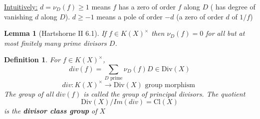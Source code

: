 \documentclass[11pt]{article}
\newtheorem{lemma}[thm]{Lemma}
\newtheorem{dfn}[thm]{Definition}
\newcommand{\lrta}{\longrightarrow}
\begin{document}
\underline{Intuitively:}
$d=\nu_D(f)\geq 1$ means $f$ has a zero of order $f$ along $D$ ( has degree of vanishing $d$ along $D$). $d\geq -1$ means a pole of order $-d$ (a zero of order $d$ of $1/f$)



\begin{lemma}[Hartshorne II 6.1] If $f\in K(X)^\times$ then $\nu_D(f)=0$ for all but at most finitely many prime divisors $D$.
\end{lemma}
\begin{dfn}
For 
$f\in K(X)^\times$,
$$
div(f)=\sum_{D\text{ prime}} \nu_D(f) D \in \text{Div}(X)
$$
$$
div:K(X)^\times\lrta \text{Div}(X)\text{ group morphism }
$$
The group of all $div(f) $ is called the group of principal divisors. The quotient
$$
\text{Div}(X)/Im(div)=\text{Cl}(X)
$$
is the \textbf{divisor class group } of $X$
\end{dfn}
\end{document}
